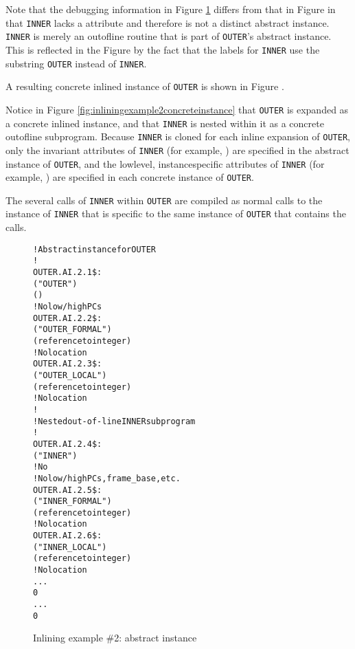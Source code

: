 Note that the debugging information in 
Figure \ref{fig:inliningexample2abstractinstance}
differs from that in 
Figure 
in that \texttt{INNER} lacks a 
\DWATinline{} attribute
and therefore is not a distinct abstract instance. \texttt{INNER}
is merely an out\dash of\dash line routine that is part of \texttt{OUTER}\textquoteright s
abstract instance. This is reflected in the Figure by
the fact that the labels for \texttt{INNER} use the substring \texttt{OUTER}
instead of \texttt{INNER}.

A resulting 
concrete inlined instance of \texttt{OUTER} is shown in
Figure .

Notice in 
Figure \ref{fig:inliningexample2concreteinstance}
that \texttt{OUTER} is expanded as a concrete
inlined instance, and that \texttt{INNER} is nested within it as a
concrete out\dash of\dash line subprogram. Because \texttt{INNER} is cloned
for each inline expansion of \texttt{OUTER}, only the invariant
attributes of \texttt{INNER} 
(for example, \DWATname) are specified
in the abstract instance of \texttt{OUTER}, and the low\dash level,
instance\dash specific attributes of \texttt{INNER} (for example,
\DWATlowpc) are specified in 
each concrete instance of \texttt{OUTER}.

The several calls of \texttt{INNER} within \texttt{OUTER} are compiled as normal
calls to the instance of \texttt{INNER} that is specific to the same
instance of \texttt{OUTER} that contains the calls.

\begin{figure}[t]
\begin{dwflisting}
\begin{alltt}
    ! Abstract instance for OUTER
    ! 
OUTER.AI.2.1\$:
    \DWTAGsubprogram
        \DWATname("OUTER")
        \DWATinline(\DWINLdeclaredinlined)
        ! No low/high PCs
OUTER.AI.2.2\$:
        \DWTAGformalparameter
            \DWATname("OUTER\_FORMAL")
            \DWATtype(reference to integer)
            ! No location
OUTER.AI.2.3\$:
        \DWTAGvariable
            \DWATname("OUTER\_LOCAL")
            \DWATtype(reference to integer)
            ! No location
        !
        ! Nested out-of-line INNER subprogram
        !
OUTER.AI.2.4\$:
        \DWTAGsubprogram
            \DWATname("INNER")
            ! No \DWATinline
            ! No low/high PCs, frame\_base, etc.
OUTER.AI.2.5\$:
            \DWTAGformalparameter
                \DWATname("INNER\_FORMAL")
                \DWATtype(reference to integer)
                ! No location
OUTER.AI.2.6\$:
            \DWTAGvariable
                \DWATname("INNER\_LOCAL")
                \DWATtype(reference to integer)
                ! No location
            ...
            0
        ...
        0
\end{alltt}
\end{dwflisting}
\caption{Inlining example \#2: abstract instance}
\label{fig:inliningexample2abstractinstance}
\end{figure}

